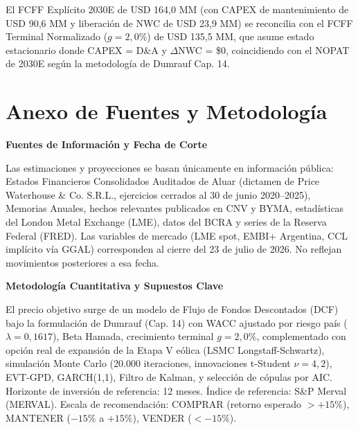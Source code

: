 \documentclass[11pt,a4paper]{article}
\begin{document}
\noindent
{\small El FCFF Explícito 2030E de USD 164,0 MM (con CAPEX de mantenimiento de USD 90,6 MM y liberación de NWC de USD 23,9 MM) se reconcilia con el FCFF Terminal Normalizado ($g = 2,0\%$) de USD 135,5 MM, que asume estado estacionario donde CAPEX = D\&A y $\Delta$NWC = \$0, coincidiendo con el NOPAT de 2030E según la metodología de Dumrauf Cap. 14.\par}

\section*{Anexo de Fuentes y Metodología}

\noindent
\textbf{\color{gsnavy} Fuentes de Información y Fecha de Corte}\\[2pt]
{\small Las estimaciones y proyecciones se basan únicamente en información pública: Estados Financieros Consolidados Auditados de Aluar (dictamen de Price Waterhouse \& Co. S.R.L., ejercicios cerrados al 30 de junio 2020--2025), Memorias Anuales, hechos relevantes publicados en CNV y BYMA, estadísticas del London Metal Exchange (LME), datos del BCRA y series de la Reserva Federal (FRED). Las variables de mercado (LME spot, EMBI+ Argentina, CCL implícito vía GGAL) corresponden al cierre del 23 de julio de 2026. No reflejan movimientos posteriores a esa fecha.\par}

\vspace{0.2cm}
\noindent
\textbf{\color{gsnavy} Metodología Cuantitativa y Supuestos Clave}\\[2pt]
{\small El precio objetivo surge de un modelo de Flujo de Fondos Descontados (DCF) bajo la formulación de Dumrauf (Cap. 14) con WACC ajustado por riesgo país ($\lambda=0,1617$), Beta Hamada, crecimiento terminal $g=2,0\%$, complementado con opción real de expansión de la Etapa V eólica (LSMC Longstaff-Schwartz), simulación Monte Carlo (20.000 iteraciones, innovaciones t-Student $\nu=4,2$), EVT-GPD, GARCH(1,1), Filtro de Kalman, y selección de cópulas por AIC. Horizonte de inversión de referencia: 12 meses. Índice de referencia: S\&P Merval (MERVAL). Escala de recomendación: COMPRAR (retorno esperado $>+15\%$), MANTENER ($-15\%$ a $+15\%$), VENDER ($<-15\%$).\par}
\end{document}
